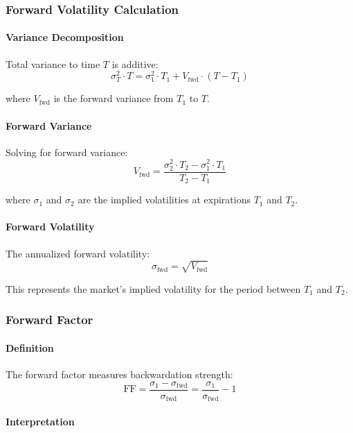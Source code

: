 \subsubsection{Forward Volatility Calculation}

\paragraph{Variance Decomposition}

Total variance to time $T$ is additive:
\[
\sigma_T^2 \cdot T = \sigma_1^2 \cdot T_1 + V_{\text{fwd}} \cdot (T - T_1)
\]

where $V_{\text{fwd}}$ is the forward variance from $T_1$ to $T$.

\paragraph{Forward Variance}

Solving for forward variance:
\[
V_{\text{fwd}} = \frac{\sigma_2^2 \cdot T_2 - \sigma_1^2 \cdot T_1}{T_2 - T_1}
\]

where $\sigma_1$ and $\sigma_2$ are the implied volatilities at expirations $T_1$ and $T_2$.

\paragraph{Forward Volatility}

The annualized forward volatility:
\[
\sigma_{\text{fwd}} = \sqrt{V_{\text{fwd}}}
\]

This represents the market's implied volatility for the period between $T_1$ and $T_2$.

\subsubsection{Forward Factor}

\paragraph{Definition}

The forward factor measures backwardation strength:
\[
\text{FF} = \frac{\sigma_1 - \sigma_{\text{fwd}}}{\sigma_{\text{fwd}}} = \frac{\sigma_1}{\sigma_{\text{fwd}}} - 1
\]

\paragraph{Interpretation}


